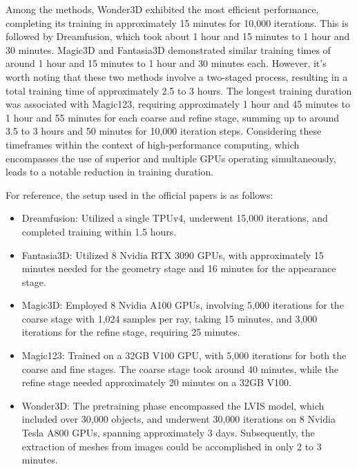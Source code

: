 Among the methods, Wonder3D exhibited the most efficient performance, completing its training in approximately 15 minutes for 10,000 iterations. This is followed by Dreamfusion, which took about 1 hour and 15 minutes to 1 hour and 30 minutes. Magic3D and Fantasia3D demonstrated similar training times of around 1 hour and 15 minutes to 1 hour and 30 minutes each. However, it's worth noting that these two methods involve a two-staged process, resulting in a total training time of approximately 2.5 to 3 hours. The longest training duration was associated with Magic123, requiring approximately 1 hour and 45 minutes to 1 hour and 55 minutes for each coarse and refine stage, summing up to around 3.5 to 3 hours and 50 minutes for 10,000 iteration steps. 
Considering these timeframes within the context of high-performance computing, which encompasses the use of superior and multiple GPUs operating simultaneously, leads to a notable reduction in training duration.

For reference, the setup used in the official papers is as follows:

\begin{itemize}
    \item Dreamfusion: Utilized a single TPUv4, underwent 15,000 iterations, and completed training within 1.5 hours.
    
    \item Fantasia3D\@: Utilized 8 Nvidia RTX 3090 GPUs, with approximately 15 minutes needed for the geometry stage and 16 minutes for the appearance stage.
    
    \item Magic3D\@: Employed 8 Nvidia A100 GPUs, involving 5,000 iterations for the coarse stage with 1,024 samples per ray, taking 15 minutes, and 3,000 iterations for the refine stage, requiring 25 minutes.
    
    \item Magic123: Trained on a 32GB V100 GPU, with 5,000 iterations for both the coarse and fine stages. The coarse stage took around 40 minutes, while the refine stage needed approximately 20 minutes on a 32GB V100.
    
    \item Wonder3D\@: The pretraining phase encompassed the LVIS model, which included over 30,000 objects, and underwent 30,000 iterations on 8 Nvidia Tesla A800 GPUs, spanning approximately 3 days. Subsequently, the extraction of meshes from images could be accomplished in only 2 to 3 minutes.
\end{itemize}


